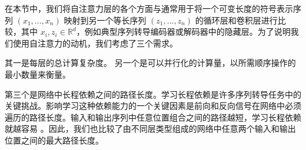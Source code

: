 
在本节中，我们将自注意力层的各个方面与通常用于将一个可变长度的符号表示序列 $(x_1, ..., x_n)$ 映射到另一个等长序列 $(z_1, ..., z_n)$ 的循环层和卷积层进行比较，其中 $x_i, z_i \in \mathbb{R}^d$，例如典型序列转导编码器或解码器中的隐藏层。为了说明我们使用自注意力的动机，我们考虑了三个需求。

其一是每层的总计算复杂度。
另一个是可以并行化的计算量，以所需顺序操作的最小数量来衡量。

第三个是网络中长程依赖之间的路径长度。学习长程依赖是许多序列转导任务中的关键挑战。影响学习这种依赖能力的一个关键因素是前向和反向信号在网络中必须遍历的路径长度。输入和输出序列中任意位置组合之间的路径越短，学习长程依赖就越容易 \citep{hochreiter2001gradient}。因此，我们也比较了由不同层类型组成的网络中任意两个输入和输出位置之间的最大路径长度。


